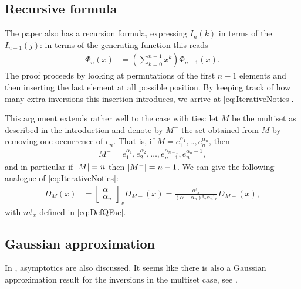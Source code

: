 \documentclass{article}
\DeclarePairedDelimiter\abs{\lvert}{\rvert}
\begin{document}
\subsection{Recursive formula}

The paper \cite{Margolius2001} also has a recursion formula, expressing $I_n(k)$ in terms of the $I_{n-1}(j)$: in terms of the generating function this reads
\begin{align}
\label{eq:IterativeNoties}
    \Phi_n(x) &= \left(\sum_{k=0}^{n-1} x^k\right) \Phi_{n-1}(x).  
\end{align}
The proof proceeds by looking at permutations of the first $n-1$ elements and then inserting the last element at all possible position. By keeping track of how many extra inversions this insertion introduces, we arrive at \eqref{eq:IterativeNoties}.

This argument extends rather well to the case with ties: let $M$ be the multiset as described in the introduction and denote by $M^-$ the set obtained from $M$ by removing one occurrence of $e_n$. That is, if $M=e_1^{\alpha_1},..,e_n^{\alpha_n}$, then
\begin{align}
    M^- = e_1^{\alpha_1}, e_2^{\alpha_2},\ldots,e_{n-1}^{\alpha_{n-1}}, e_n^{\alpha_n-1},
\end{align}
and in particular if $\abs{M}=n$ then $\abs{M^-}=n-1$. We can give the following analogue of \eqref{eq:IterativeNoties}:
\begin{align}
    D_M(x) & = \begin{bmatrix}\alpha\\ \alpha_n\end{bmatrix}_x D_{M-}(x) = \frac{\alpha!_x}{(\alpha-\alpha_n)!_x \alpha_n!_x} D_{M-}(x),
\end{align}
with $m!_x$ defined in \eqref{eq:DefQFac}.


\subsection{Gaussian approximation}

In \cite{Margolius2001}, asymptotics are also discussed. It seems like there is also a Gaussian approximation result for the inversions in the multiset case, see \cite{Conger2007}. 





\end{document}
